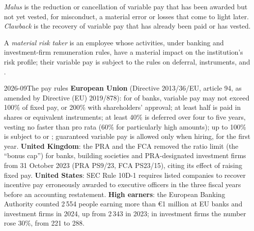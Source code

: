 \begin{definition}\label{def:fm:hiring-and-compensation:malus}
\emph{Malus} is the reduction or cancellation of variable pay that has been awarded but not yet vested, for misconduct, a material
error or losses that come to light later. \emph{Clawback} is the recovery of variable pay that has already been paid or has
vested.
\end{definition}

\begin{definition}\label{def:fm:hiring-and-compensation:mrt}
A \emph{material risk taker} is an employee whose activities, under banking and investment-firm remuneration
rules, have a material impact on the institution's risk profile; their variable pay is subject to the rules on deferral, instruments,  and
.
\end{definition}

\begin{dated}{2026-09}{The pay rules}\label{dat:fm:hiring-and-compensation:rules}
\textbf{European Union} (Directive 2013/36/EU, article 94, as amended by Directive (EU) 2019/878): for  of banks, variable pay
may not exceed 100\% of fixed pay, or 200\% with shareholders' approval; at least half is paid in shares or equivalent instruments; at least 40\%
is deferred over four to five years, vesting no faster than pro rata (60\% for particularly high amounts); up to 100\% is subject to  or
; guaranteed variable pay is allowed only when hiring, for the first year. \textbf{United Kingdom}: the PRA and the FCA removed the ratio
limit (the ``bonus cap'') for banks, building societies and PRA-designated investment firms from 31 October 2023 (PRA PS9/23, FCA PS23/15), citing
its effect of raising fixed pay. \textbf{United States}: SEC Rule 10D-1 requires listed companies to recover incentive pay erroneously awarded to
executive officers in the three fiscal years before an accounting restatement. \textbf{High earners}: the European Banking Authority counted 2\,554
people earning more than \euro1 million at EU banks and investment firms in 2024, up from 2\,343 in 2023; in investment firms the number rose 30\%,
from 221 to 288.
\end{dated}

